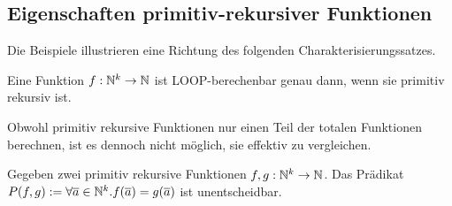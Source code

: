 \subsection{Eigenschaften primitiv-rekursiver Funktionen}
\label{sec:eigensch-prim-rekurs}


Die Beispiele illustrieren eine Richtung des folgenden
Charakterisierungssatzes.
\begin{Satz}
  Eine Funktion $f : \mathbb{N}^k \to \mathbb{N}$ ist LOOP-berechenbar genau dann,
  wenn sie primitiv rekursiv ist.
\end{Satz}

Obwohl primitiv rekursive Funktionen nur einen Teil der totalen Funktionen berechnen,
ist es dennoch nicht möglich, sie effektiv zu vergleichen.

\begin{Satz}\label{thm:pr-equality-undecidable}
  Gegeben zwei primitiv rekursive Funktionen $f, g : \mathbb{N}^k \to \mathbb{N}$.
  Das Prädikat $P (f, g) := \forall \overline{a}\in\mathbb{N}^k. f (\overline{a}) = g (\overline{a})$
  ist unentscheidbar.
\end{Satz}
